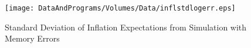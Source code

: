 \begin{figure}
 \centerline{\texttt{[image: DataAndPrograms/Volumes/Data/inflstdlogerr.eps]}}%
 \caption{Standard Deviation of Inflation Expectations from Simulation with Memory Errors}
 \label{fig:inflstdlogerr}
\end{figure}

